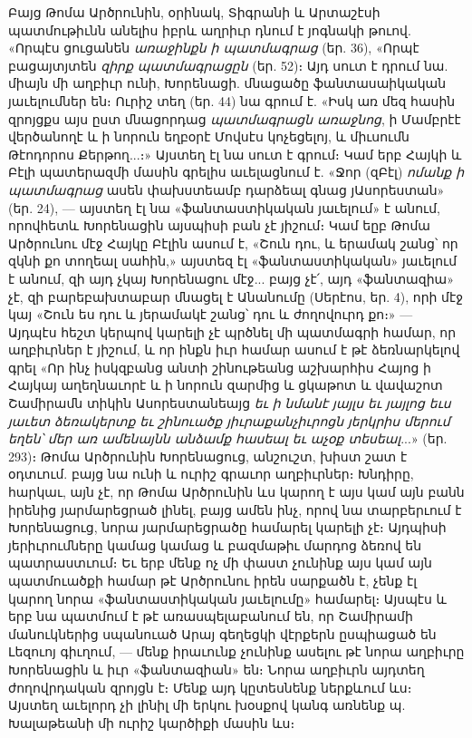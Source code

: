 \documentclass{article}
\begin{document}
{Բայց Թոմա Արծրունին, օրինակ, Տիգրանի և Արտաշէսի պատմութիւնն անելիս իբրև աղրիւր դնում է յոգնակի թուով. «Որպէս ցուցանեն \emph{առաջինքն ի պատմագրաց} (եր. 36), «Որպէ բացայտյտեն \emph{զիրք պատմագրացըն} (եր. 52)։ Այդ սուտ է դրում նա. միայն մի աղբիւր ունի, Խորենացի. մնացածը ֆանտասաիկական յաւելումներ են։ Ուրիշ տեղ (եր. 44) նա գրում է. «Իսկ առ մեզ հասին զրոյցքս այս ըստ մնացորդաց \emph{պատմագրացն առաջնոց}, ի Մամբրէէ վերծանողէ և ի նորուն եղբօրէ Մովսէս կոչեցելոյ, և միւսումն Թէոդորոս Քերթող...։» Այստեղ էլ նա սուտ է գրում։ Կամ երբ Հայկի և Բէլի պատերազմի մասին գրելիս աւելացնում է. «Ջոր (զԲէլ) \emph{ոմանք ի պատմագրաց} ասեն փախստեամբ դարձեալ գնաց յԱսորեստան» (եր. 24), — այստեղ էլ նա «ֆանտաստիկական յաւելում» է անում, որովհետև Խորենացին այսպիսի բան չէ յիշում։ Կամ եըբ Թոմա Արծրունու մէջ Հայկը Բէլին ասում է, «Շուն դու, և երամակ շանց՝ որ զկնի քո տողեալ սահին,» այստեզ էլ «ֆանտաստիկական» յաւելում է անում, զի այդ չկայ Խորենացու մէջ... բայց չէ՛, այդ «ֆանտազիա» չէ, զի բարեբախտաբար մնացել է Անանումը (Սերէոս, եր. 4), որի մէջ կայ «Շուն ես դու և յերամակէ շանց՝ դու և ժողովուրդ քո։» — Այդպէս հեշտ կերպով կարելի չէ պրծնել մի պատմագրի համար, որ աղբիւրներ է յիշում, և որ ինքն իւր համար ասում է թէ ձեռնարկելով գրել «Որ ինչ իսկզբանց անտի շինութեանց աշխարհիս Հայոց ի Հայկայ աղեղնաւորէ և ի նորուն զարմից և ցկաթոտ և վավաշոտ Շամիրամն տիկին Ասորեստանեայց \emph{եւ ի նմանէ յայլս եւ յայլոց եւս յաւետ ձեռակերտք եւ շինուածք յիւրաքանչիւրոցն յերկրիս մերում եղեն՝ մեր առ ամենայնն անձամք հասեալ եւ աչօք տեսեալ}...» (եր. 293)։ Թոմա Արծրունին Խորենացուց, անշուշտ, խիստ շատ է օդտւում. բայց նա ունի և ուրիշ գրաւոր աղբիւրներ։ Խնդիրը, հարկաւ, այն չէ, որ Թոմա Արծրունին ևս կարող է այս կամ այն բանն իրենից յարմարեցրած լինել, բայց ամեն ինչ, որով նա տարբերւում է Խորենացուց, նորա յարմարեցրածը համարել կարելի չէ։ Այդպիսի յերիւրումները կամաց կամաց և բազմաթիւ մարդոց ձեռով են պատրաստւում։ Եւ երբ մենք ոչ մի փաստ չունինք այս կամ այն պատմուածքի համար թէ Արծրունու իրեն սարքածն է, չենք էլ կարող նորա «ֆանտաստիկական յաւելումը» համարել։ Այսպէս և երբ նա պատմում է թէ առասպելաբանում են, որ Շամիրամի մանուկներից սպանուած Արայ գեղեցկի վէրքերն ըսպիացած են Լեզուոյ գիւղում, — մենք իրաւունք չունինք ասելու թէ նորա աղբիւրը Խորենացին և իւր «ֆանտազիան» են։ Նորա աղբիւրն այդտեղ ժողովրդական զրոյցն է։ Մենք այդ կըտեսնենք ներքևում ևս։ Այստեղ աւելորդ չի լինիլ մի երկու խօսքով կանգ առնենք պ. Խալաթեանի մի ուրիշ կարծիքի մասին ևս։

}
\end{document}
